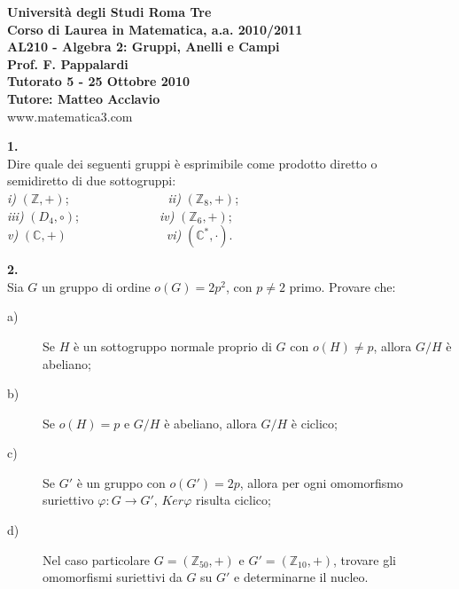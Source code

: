 \documentclass[italian,a4paper,11pt]
{article}
\newcommand{\Z}{\mathbb Z}
\newcommand{\C}{\mathbb{C}}
\newcommand{\frecdl}{\longrightarrow}
\newcommand{\acc}{\`}
\begin{document}
\begin{center}

\textbf{Universit\`a degli Studi Roma Tre}\\

\textbf{Corso di Laurea in Matematica, a.a. 2010/2011}\\

\textbf{AL210 - Algebra 2: Gruppi, Anelli e Campi}\\

\textbf{Prof. F. Pappalardi}\\

\textbf{Tutorato 5 - 25	 Ottobre 2010}\\

\textbf{Tutore: Matteo Acclavio}\\

www.matematica3.com\\
\end{center}


\vspace{1cm}
\noindent
\begin{Ex}\textbf{ 1.}\\
Dire quale dei seguenti gruppi \`e esprimibile come prodotto diretto o\\
semidiretto di due sottogruppi:\\
\textsl{i)} $(\Z, +)$;\ \ \ \ \ \ \ \ \ \ \ \ \ \ \ \ \textsl{ii)}	 $(\Z_8, +)$;\\
\textsl{iii)}	 $(D_4, \circ)$;\ \ \ \ \ \ \ \ \ \ \ \ \  \textsl{iv)}	 $(\Z_6, +)$;\\
\textsl{v)} $(\C, +)$\ \ \ \ \ \ \ \ \ \ \ \ \ \ \ \  \textsl{vi)} $(\C^{\ast}, \cdot)$.

\end{Ex}


\vspace{0.4cm}
\noindent
\begin{Ex}\textbf{ 2.}\\
Sia $G$ un gruppo di ordine $o(G)=2p^2$, con $p\neq 2$ primo.
Provare che:
\begin{description}
	\item[a)] Se $H$ \acc e un sottogruppo normale proprio di $G$ con $o(H)\neq p$, allora $G/H$ \acc e abeliano;
	\item[b)] Se $o(H)=p$ e $G/H$ \acc e abeliano, allora $G/H$ \acc e ciclico;
	\item[c)] Se $G'$ \acc e un gruppo con $o(G')=2p$, allora per ogni omomorfismo suriettivo $\varphi:G\frecdl G'$, $Ker \varphi$ risulta ciclico;
	\item[d)] Nel caso particolare $G=(\Z_{50},+)$ e $G'=(\Z_{10},+)$, trovare gli omomorfismi suriettivi da $G$ su $G'$ e determinarne il nucleo.
\end{description}
\end{Ex}
\end{document}
